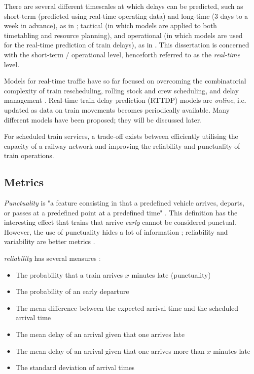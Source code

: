 \documentclass{article}
\begin{document}
There are several different timescales at which delays can be predicted, such as short-term (predicted using real-time operating data) and long-time (3 days to a week in advance), as in \cite{wang_zhang_2019};
tactical (in which models are applied to both timetabling and resource planning), and operational (in which models are used for the real-time prediction of train delays), as in \cite{markovic_milinkovic_tikhonov_schonfeld_2015}. This dissertation is concerned with the short-term / operational level, henceforth referred to as the \textit{real-time} level. 

Models for real-time traffic have so far focused on overcoming the combinatorial complexity of train rescheduling, rolling stock and crew scheduling, and delay management \cite{kecman_corman_meng_2015}.
Real-time train delay prediction (RTTDP) models are \textit{online}, i.e. updated as data on train movements becomes periodically available.  Many different models have been proposed; they will be discussed later.

For scheduled train services, a trade-off exists between efficiently utilising the capacity of a railway network and improving the reliability and punctuality of train operations. 

\subsection{Metrics}

\textit{Punctuality} is "a feature consisting in that a predefined vehicle arrives, departs, or passes at a predefined point at a predefined time" \cite{rudnicki_1997}. This definition has the interesting effect that trains 
that arrive \textit{early} cannot be considered punctual. However, the use of punctuality hides a lot of information \cite{skagestad_2004}; reliability and variability are better metrics \cite{olsson_haugland_2004}.

\textit{reliability} has several measures \cite{rietveld_bruinsma_van_vuuren_2001}:

\begin{itemize}
	\item The probability that a train arrives $x$ minutes late (punctuality)
	\item The probability of an early departure
	\item The mean difference between the expected arrival time and the scheduled arrival time
	\item The mean delay of an arrival given that one arrives late
	\item The mean delay of an arrival given that one arrives more than $x$ minutes late
	\item The standard deviation of arrival times
\end{itemize}
\end{document}
